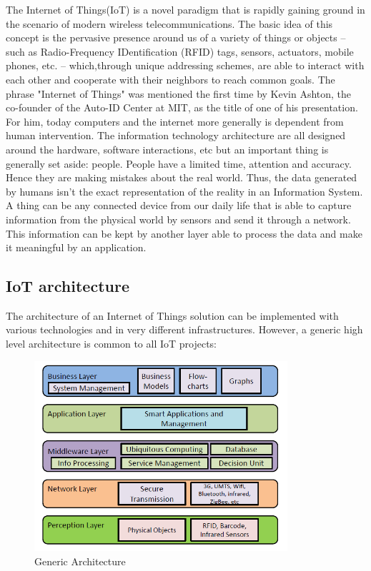 \documentclass[11pt]{article}
\begin{document}
The Internet of Things(IoT) is a novel paradigm that is rapidly gaining ground in the scenario of modern wireless telecommunications. The basic idea of this concept is the pervasive presence around us of a variety of things or objects – such as Radio-Frequency IDentification (RFID) tags, sensors, actuators, mobile phones, etc. – which,through unique addressing schemes, are able to interact with each other and cooperate with their neighbors to reach common goals. \cite{2}
\newline
\newline
The phrase "Internet of Things" was mentioned the first time by Kevin Ashton, the co-founder of the Auto-ID Center at MIT, as the title of one of his presentation. For him, today computers and the internet more generally is dependent from human intervention. The information technology architecture are all designed around the hardware, software interactions, etc but an important thing is generally set aside: people. People have a limited time, attention and accuracy. Hence they are making mistakes about the real world. Thus, the data generated by humans isn't the exact representation of the reality in an Information System.
\newline
\newline
A thing can be any connected device from our daily life that is able to capture information from the physical world by sensors and send it through a network. This information can be kept by another layer able to process the data and make it meaningful by an application. 

\subsection{IoT architecture}

The architecture of an Internet of Things solution can be implemented with various technologies and in very different infrastructures. However, a generic high level architecture is common to all IoT projects:
\begin{figure}[H]
	\includegraphics[width=\textwidth,height=200pt]{assets/Abstract_IoT_Architecture.png} 
	\caption{Generic Architecture}
	\label{fig:genericArchitecture}
\end{figure}
\end{document}
